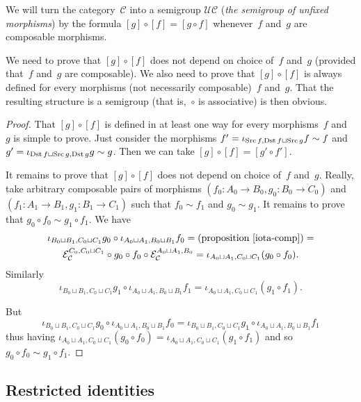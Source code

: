 \begin{defn}
We will turn the category~$\mathcal{C}$ into a semigroup
$\mathcal{U}\mathcal{C}$
(\emph{the semigroup of unfixed morphisms}) by
the formula $[g]\circ[f] = [g\circ f]$ whenever~$f$ and~$g$
are composable morphisms.
\end{defn}

We need to prove that $[g]\circ[f]$ does not depend on
choice of~$f$ and~$g$ (provided that~$f$ and~$g$
are composable). We also need to prove that $[g]\circ[f]$
is always defined for every morphisms (not necessarily
composable)~$f$ and~$g$. That the resulting structure is
a semigroup (that is,~$\circ$ is associative) is then
obvious.

\begin{proof}
That $[g]\circ[f]$ is defined in at least one way for every
morphisms~$f$ and~$g$ is simple to prove. Just consider the
morphisms
$f'=\iota_{\operatorname{Src} f,\operatorname{Dst} f\sqcup\operatorname{Src} g}f\sim f$ and
$g'=\iota_{\operatorname{Dst} f\sqcup\operatorname{Src} g,\operatorname{Dst} g}g\sim g$.
Then we can take $[g]\circ[f]=[g'\circ f']$.

It remains to prove that $[g]\circ[f]$ does not depend on
choice of~$f$ and~$g$. Really, take arbitrary composable
pairs of morphisms $(f_0:A_0\to B_0,g_0:B_0\to C_0)$ and
$(f_1:A_1\to B_1,g_1:B_1\to C_1)$ such that
$f_0\sim f_1$ and $g_0\sim g_1$. It remains to prove that
$g_0\circ f_0\sim g_1\circ f_1$.
We have
\begin{multline*}
\iota_{B_0\sqcup B_1,C_0\sqcup C_1}g_0 \circ
\iota_{A_0\sqcup A_1,B_0\sqcup B_1}f_0
= \text{(proposition~\ref{iota-comp})} = \\
\mathcal{E}_{\mathcal{C}}^{C_0,C_0\sqcup C_1}\circ g_0 \circ
f_0\circ\mathcal{E}_{\mathcal{C}}^{A_0\sqcup A_1,B_0} =
\iota_{A_0\sqcup A_1,C_0\sqcup C_1}(g_0\circ f_0).
\end{multline*}
Similarly
\[\iota_{B_0\sqcup B_1,C_0\sqcup C_1}g_1 \circ
\iota_{A_0\sqcup A_1,B_0\sqcup B_1}f_1 =
\iota_{A_0\sqcup A_1,C_0\sqcup C_1}(g_1\circ f_1).\]

But
\[\iota_{B_0\sqcup B_1,C_0\sqcup C_1}g_0 \circ
\iota_{A_0\sqcup A_1,B_0\sqcup B_1}f_0 =
\iota_{B_0\sqcup B_1,C_0\sqcup C_1}g_1 \circ
\iota_{A_0\sqcup A_1,B_0\sqcup B_1}f_1\]
thus having
$\iota_{A_0\sqcup A_1,C_0\sqcup C_1}(g_0\circ f_0) =
\iota_{A_0\sqcup A_1,C_0\sqcup C_1}(g_1\circ f_1)$ and so
$g_0\circ f_0\sim g_1\circ f_1$.
\end{proof}

\subsection{Restricted identities}


